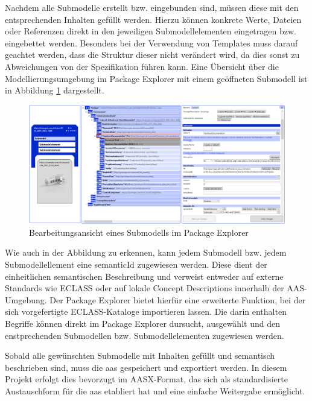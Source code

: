 Nachdem alle Submodelle erstellt bzw. eingebunden sind, müssen diese mit den entsprechenden Inhalten gefüllt werden.
Hierzu können konkrete Werte, Dateien oder Referenzen direkt in den jeweiligen Submodellelementen eingetragen bzw. eingebettet werden.
Besonders bei der Verwendung von Templates muss darauf geachtet werden, dass die Struktur dieser nicht verändert wird, da dies sonst zu Abweichungen von der Spezifikation führen kann.
Eine Übersicht über die Modellierungsumgebung im Package Explorer mit einem geöffneten Submodell ist in Abbildung \ref{fig:BearbeitungsansichtPackageExplorer} dargestellt.

\begin{figure}[htbp]
    \centering
    \includegraphics[width=1\textwidth]{Bilder/ModellierungAAS/ModellierungMitDokumentation.PNG}
    \caption{Bearbeitungsansicht eines Submodells im Package Explorer}
    \label{fig:BearbeitungsansichtPackageExplorer}
\end{figure}

Wie auch in der Abbildung zu erkennen, kann jedem Submodell bzw. jedem Submodellellement eine semanticId zugewiesen werden.
Diese dient der einheitlichen semantischen Beschreibung und verweist entweder auf externe Standards wie ECLASS oder auf lokale Concept Descriptions innerhalb der AAS-Umgebung.
Der Package Explorer bietet hierfür eine erweiterte Funktion, bei der sich vorgefertigte ECLASS-Kataloge importieren lassen.
Die darin enthalten Begriffe können direkt im Package Explorer dursucht, ausgewählt und den enstprechenden Submodellen bzw. Submodellelementen zugewiesen werden.

Sobald alle gewünschten Submodelle mit Inhalten gefüllt und semantisch beschrieben sind, muss die \acs{aas} gespeichert und exportiert werden.
In diesem Projekt erfolgt dies bevorzugt im AASX-Format, das sich als standardisierte Austauschform für die \acs{aas} etabliert hat und eine einfache Weitergabe ermöglicht.


